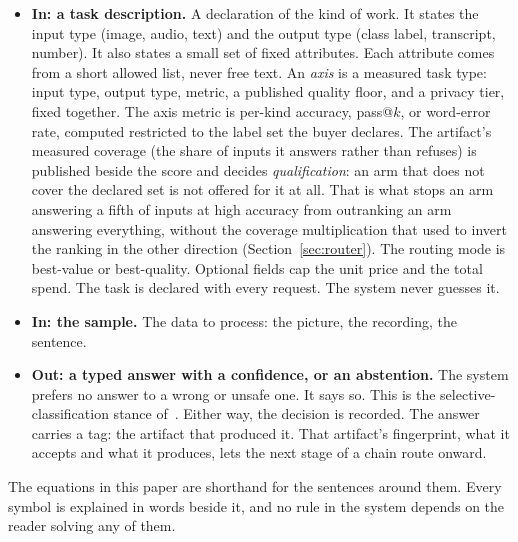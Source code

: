 \documentclass[11pt]{article}
\begin{document}
\begin{itemize}
    \item \textbf{In: a task description.} A declaration of the kind of
          work. It states the input type (image, audio, text) and the
          output type (class label, transcript, number). It also states a
          small set of fixed attributes. Each attribute comes from a short
          allowed list, never free text. An \emph{axis} is a measured task
          type: input type, output type, metric, a published quality
          floor, and a privacy tier, fixed together. The axis metric is
          per-kind accuracy, pass@$k$, or word-error rate, computed
          restricted to the label set the buyer declares. The artifact's
          measured coverage (the share of inputs it answers rather than
          refuses) is published beside the score and decides
          \emph{qualification}: an arm that does not cover the declared set
          is not offered for it at all. That is what stops an arm answering
          a fifth of inputs at high accuracy from outranking an arm
          answering everything, without the coverage multiplication that
          used to invert the ranking in the other direction
          (Section~\ref{sec:router}).
          The routing mode is
          best-value or best-quality. Optional fields cap the unit price
          and the total spend. The task is declared with every request. The
          system never guesses it.
    \item \textbf{In: the sample.} The data to process: the picture,
          the recording, the sentence.
    \item \textbf{Out: a typed answer with a confidence, or an
              abstention.} The system prefers no answer to a wrong or unsafe
          one. It says so. This is the selective-classification stance
          of~\cite{geifman2017}. Either way, the decision is recorded. The
          answer carries a tag: the artifact that produced it. That
          artifact's fingerprint, what it accepts and what it produces,
          lets the next stage of a chain route onward.
\end{itemize}

The equations in this paper are shorthand for the sentences
around them. Every symbol is explained in words beside it, and
no rule in the system depends on the reader solving any of them.
\end{document}

